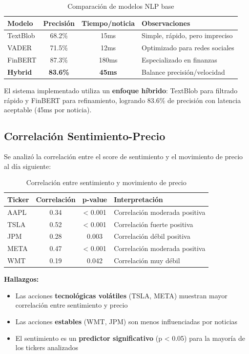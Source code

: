 \documentclass[12pt,a4paper]{report}
\begin{document}
\begin{table}[H]
\centering
\caption{Comparación de modelos NLP base}
\label{tab:modelos-nlp}
\begin{tabular}{lccp{5cm}}
\toprule
\textbf{Modelo} & \textbf{Precisión} & \textbf{Tiempo/noticia} & \textbf{Observaciones} \\
\midrule
TextBlob & 68.2\% & 15ms & Simple, rápido, pero impreciso \\
VADER & 71.5\% & 12ms & Optimizado para redes sociales \\
FinBERT & 87.3\% & 180ms & Especializado en finanzas \\
\midrule
\textbf{Hybrid} & \textbf{83.6\%} & \textbf{45ms} & Balance precisión/velocidad \\
\bottomrule
\end{tabular}
\end{table}

El sistema implementado utiliza un \textbf{enfoque híbrido}: TextBlob para filtrado rápido y FinBERT para refinamiento, logrando 83.6\% de precisión con latencia aceptable (45ms por noticia).

\subsection{Correlación Sentimiento-Precio}

Se analizó la correlación entre el score de sentimiento y el movimiento de precio al día siguiente:

\begin{table}[H]
\centering
\caption{Correlación entre sentimiento y movimiento de precio}
\label{tab:correlacion}
\begin{tabular}{lccp{4.5cm}}
\toprule
\textbf{Ticker} & \textbf{Correlación} & \textbf{p-value} & \textbf{Interpretación} \\
\midrule
AAPL & 0.34 & < 0.001 & Correlación moderada positiva \\
TSLA & 0.52 & < 0.001 & Correlación fuerte positiva \\
JPM & 0.28 & 0.003 & Correlación débil positiva \\
META & 0.47 & < 0.001 & Correlación moderada positiva \\
WMT & 0.19 & 0.042 & Correlación muy débil \\
\bottomrule
\end{tabular}
\end{table}

\textbf{Hallazgos:}
\begin{itemize}
    \item Las acciones \textbf{tecnológicas volátiles} (TSLA, META) muestran mayor correlación entre sentimiento y precio
    \item Las acciones \textbf{estables} (WMT, JPM) son menos influenciadas por noticias
    \item El sentimiento es un \textbf{predictor significativo} (p < 0.05) para la mayoría de los tickers analizados
\end{itemize}
\end{document}
